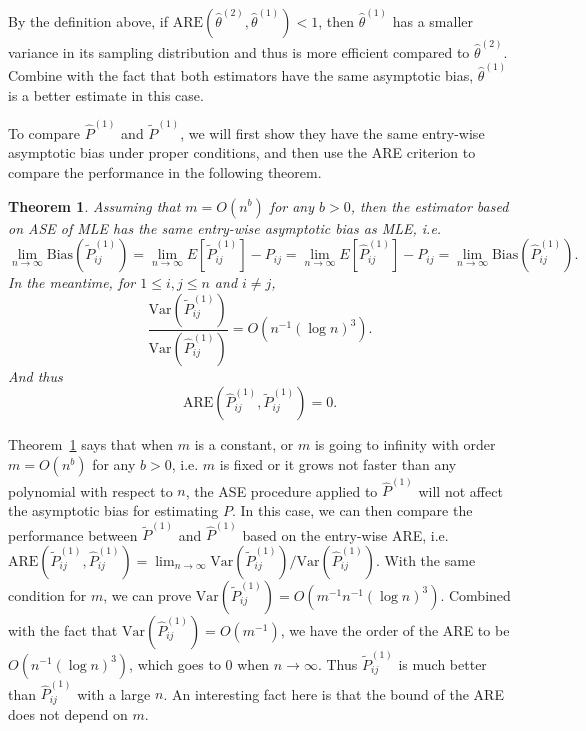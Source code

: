 \documentclass[a4paper]{article}
\newtheorem{theorem}[fact]{Theorem}
\renewcommand{\hat}{\widehat}
\begin{document}
By the definition above, if $\mathrm{ARE}(\hat{\theta}^{(2)}, \hat{\theta}^{(1)}) < 1$, then $\hat{\theta}^{(1)}$ has a smaller variance in its sampling distribution and thus is more efficient compared to $\hat{\theta}^{(2)}$. Combine with the fact that both estimators have the same asymptotic bias, $\hat{\theta}^{(1)}$ is a better estimate in this case.

To compare $\hat{P}^{(1)}$ and $\widetilde{P}^{(1)}$, we will first show they have the same entry-wise asymptotic bias under proper conditions, and then use the ARE criterion to compare the performance in the following theorem.

\begin{theorem}
\label{thm:MLEvsMLEASE}
Assuming that $m = O(n^b)$ for any $b > 0$, then the estimator based on ASE of MLE has the same entry-wise asymptotic bias as MLE, i.e.
\[
	\lim_{n \to \infty} \mathrm{Bias}(\widetilde{P}_{ij}^{(1)}) = \lim_{n \to \infty} E[\widetilde{P}_{ij}^{(1)}] - P_{ij} = \lim_{n \to \infty} E[\hat{P}^{(1)}_{ij}] - P_{ij}
    = \lim_{n \to \infty} \mathrm{Bias}(\hat{P}_{ij}^{(1)}).
\]
In the meantime, for $1 \le i, j \le n$ and $i \ne j$,
\[
	\frac{\mathrm{Var}(\widetilde{P}_{ij}^{(1)})}{\mathrm{Var}(\hat{P}_{ij}^{(1)})}
    = O(n^{-1} (\log n)^3).
\]
And thus
\[
	\mathrm{ARE}(\hat{P}_{ij}^{(1)}, \widetilde{P}_{ij}^{(1)}) = 0.
\]
\end{theorem}

Theorem~\ref{thm:MLEvsMLEASE} says that when $m$ is a constant, or $m$ is going to infinity with order $m = O(n^b)$ for any $b > 0$, i.e. $m$ is fixed or it grows not faster than any polynomial with respect to $n$, the ASE procedure applied to $\hat{P}^{(1)}$ will not affect the asymptotic bias for estimating $P$.
In this case, we can then compare the performance between $\widetilde{P}^{(1)}$ and $\hat{P}^{(1)}$ based on the entry-wise ARE, i.e. $\mathrm{ARE}(\widetilde{P}^{(1)}_{ij}, \hat{P}^{(1)}_{ij}) = \lim_{n \to \infty} \mathrm{Var}(\widetilde{P}_{ij}^{(1)})/\mathrm{Var}(\hat{P}_{ij}^{(1)})$. With the same condition for $m$, we can prove $\mathrm{Var}(\widetilde{P}_{ij}^{(1)}) = O(m^{-1} n^{-1} (\log n)^3)$. Combined with the fact that $\mathrm{Var}(\hat{P}_{ij}^{(1)}) = O(m^{-1})$, we have the order of the ARE to be $O(n^{-1} (\log n)^3)$, which goes to 0 when $n \to \infty$. Thus $\widetilde{P}_{ij}^{(1)}$ is much better than $\hat{P}_{ij}^{(1)}$ with a large $n$. An interesting fact here is that the bound of the ARE does not depend on $m$.
\end{document}
